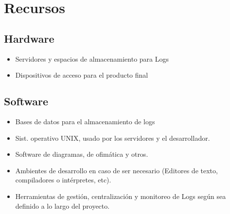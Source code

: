 \section{Recursos}
  \subsection{Hardware}
    \begin{itemize}
      \item Servidores y espacios de almacenamiento para Logs
      \item Dispositivos de acceso para el producto final
    \end{itemize}
  \subsection{Software}
    \begin{itemize}
      \item Bases de datos para el almacenamiento de logs
      \item Sist. operativo UNIX, usado por los servidores y el desarrollador.
      \item Software de diagramas, de ofimática y otros.
      \item Ambientes de desarrollo en caso de ser necesario (Editores de texto, compiladores o intérpretes, etc).
      \item Herramientas de gestión, centralización y monitoreo de Logs según sea definido a lo largo del proyecto.
    \end{itemize}
